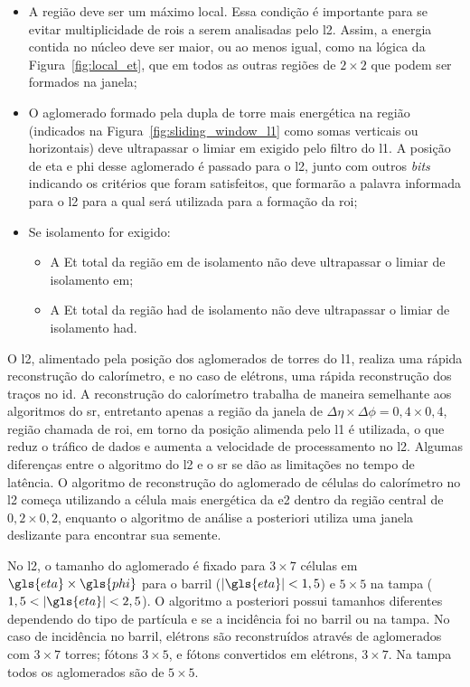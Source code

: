 \begin{itemize}
\item A região deve ser um máximo local. Essa condição é importante para se
evitar multiplicidade de \glspl{roi} a serem analisadas pelo \gls{l2}.
Assim, a energia contida no núcleo deve ser
maior, ou ao menos igual, como na lógica da Figura~\ref{fig:local_et}, 
que em todos as outras regiões de $2\times2$ que podem ser formados na
janela;
\item O aglomerado formado pela dupla de torre mais energética na região
(indicados na Figura~\ref{fig:sliding_window_l1} como somas verticais ou horizontais) deve ultrapassar o limiar
\gls{em} exigido pelo filtro do \gls{l1}. A posição de \gls{eta} e \gls{phi} desse aglomerado é passado
para o \gls{l2}, junto com outros \emph{bits} indicando os critérios que foram
satisfeitos, que formarão a palavra informada para o \gls{l2} para a qual será
utilizada para a formação da \gls{roi};
\item Se isolamento for exigido: 
\begin{itemize}
\item A \gls{Et} total da região \gls{em} de
isolamento não deve ultrapassar o limiar de isolamento \gls{em};
\item A \gls{Et} total da região \gls{had} de isolamento não deve ultrapassar o
limiar de isolamento \gls{had}.
\end{itemize}
\end{itemize}


O \gls{l2}, alimentado pela posição dos
aglomerados de torres do \gls{l1}, realiza uma rápida reconstrução do
calorímetro, e no caso de elétrons, uma rápida reconstrução dos traços no \gls{id}. A
reconstrução do calorímetro trabalha de maneira semelhante aos algoritmos do
\gls{sr}, entretanto apenas a região da janela de $\Delta\eta\times\Delta\phi =
0,4 \times 0,4$, região chamada de \gls{roi}, em torno da posição alimenda pelo \gls{l1} 
é utilizada, o que reduz o tráfico de dados e aumenta a velocidade de processamento no \gls{l2}.
Algumas diferenças entre o algoritmo do \gls{l2} e o \gls{sr} se dão as
limitações no tempo de latência. O algoritmo de reconstrução do aglomerado de
células do calorímetro no \gls{l2} começa utilizando a célula mais energética da
\gls{e2} dentro da região central de $0,2 \times 0,2$, enquanto o
algoritmo de análise a posteriori utiliza uma janela deslizante para encontrar
sua semente.

No \gls{l2}, o tamanho do aglomerado é fixado para $3
\times 7$ células em $\gls{eta} \times \gls{phi}$ para o barril ($|\gls{eta}|<1,5$) e 
$5 \times 5$ na tampa ($1,5<|\gls{eta}|<2,5$). O algoritmo a posteriori possui
tamanhos diferentes dependendo do tipo de partícula e se a incidência foi no
barril ou na tampa. No caso de incidência no barril, elétrons são reconstruídos
através de aglomerados com $3\times7$ torres; fótons $3\times5$, 
e fótons convertidos em elétrons, $3\times7$. Na tampa todos os aglomerados 
são de $5\times5$.


